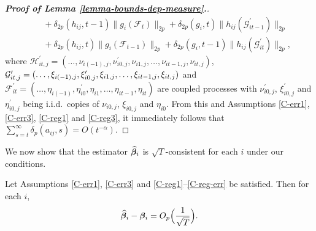 \documentclass[12pt]{article}
\begin{document}
\begin{proof}[\textnormal{\textbf{Proof of Lemma \ref{lemma-bounds-dep-measure}.}}]
\begin{align*}
&\quad + \delta_{2p}(h_{ij}, t-1) \| g_i(\mathcal{F}_t) \|_{2p} + \delta_{2p} (g_i, t) \| h_{ij}(\mathcal{G}_{it-1}^\prime) \|_{2p} \\
&\quad + \delta_{2p}(h_{ij}, t) \| g_i(\mathcal{F}_{t-1}) \|_{2p} + \delta_{2p} (g_i, t-1) \| h_{ij}(\mathcal{G}_{it}^\prime) \|_{2p}, 
\end{align*}
where $\mathcal{H}_{it,j}^\prime  = (\ldots, \nu_{i(-1),j}, \nu^\prime_{i0,j}, \nu_{i1,j}, \ldots, \nu_{it-1,j}, \nu_{it,j})$, $\mathcal{G}_{it,j}^\prime  = (\ldots, \xi_{i(-1),j}, \xi^\prime_{i0,j}, \xi_{i1,j}, \ldots, \linebreak \xi_{it-1,j}, \xi_{it,j})$ and $\mathcal{F}_{it}^\prime  = (\ldots, \eta_{i(-1)}, \eta^\prime_{i0}, \eta_{i1}, \ldots, \eta_{it-1}, \eta_{it})$ are coupled processes with $\nu_{i0,j}^\prime$, $\xi_{i0,j}^\prime$ and $\eta_{i0,j}^\prime$ being i.i.d.\ copies of $\nu_{i0,j}$, $\xi_{i0,j}$ and $\eta_{i0}$. From this and Assumptions \ref{C-err1}, \ref{C-err3}, \ref{C-reg1} and \ref{C-reg3}, it immediately follows that $\sum_{s=t}^\infty \delta_p(a_{ij}, s) = O(t^{-\alpha})$.
\end{proof}


We now show that the estimator $\widehat{\bm{\beta}}_i$ is $\sqrt{T}$-consistent for each $i$ under our conditions.


\begin{lemmaA}\label{lemma-beta-rate}
Let Assumptions \ref{C-err1}, \ref{C-err3} and \ref{C-reg1}--\ref{C-reg-err} be satisfied. Then for each $i$, 
\[ \widehat{\bm{\beta}}_i - \bm{\beta}_i = O_p\Big(\frac{1}{\sqrt{T}}\Big). \]
\end{lemmaA}
\end{document}

